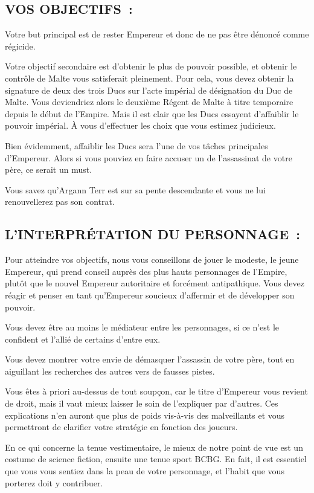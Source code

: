 \documentclass[14pt,twocolumn]{extarticle}
\begin{document}
\subsection{VOS OBJECTIFS~:}

Votre but principal est de rester Empereur et donc de ne pas être dénoncé
comme régicide.

Votre objectif secondaire est d'obtenir le plus de pouvoir possible, et obtenir
le contrôle de Malte vous satisferait pleinement. Pour cela, vous devez obtenir
la signature de deux des trois Ducs sur l'acte impérial de désignation du Duc
de Malte. Vous deviendriez alors le deuxième Régent de Malte à titre temporaire
depuis le début de l'Empire. Mais il est clair que les Ducs essayent
d'affaiblir le pouvoir impérial. À vous d'effectuer les choix que vous estimez
judicieux.

Bien évidemment, affaiblir les Ducs sera l'une de vos tâches principales
d'Empereur. Alors si vous pouviez en faire accuser un de l'assassinat de votre
père, ce serait un must.

Vous savez qu'Argann Terr est sur sa pente descendante et vous ne lui
renouvellerez pas son contrat.

\subsection{L'INTERPRÉTATION DU PERSONNAGE~:}

Pour atteindre vos objectifs, nous vous conseillons de jouer le modeste, le
jeune Empereur, qui prend conseil auprès des plus hauts personnages de
l'Empire, plutôt que le nouvel Empereur autoritaire et forcément antipathique.
Vous devez réagir et penser en tant qu'Empereur soucieux d'affermir et de
développer son pouvoir.

Vous devez être au moins le médiateur entre les personnages, si ce n'est le
confident et l'allié de certains d'entre eux.

Vous devez montrer votre envie de démasquer l'assassin de votre père, tout en
aiguillant les recherches des autres vers de fausses pistes.

Vous êtes à priori au-dessus de tout soupçon, car le titre d'Empereur vous
revient de droit, mais il vaut mieux laisser le soin de l'expliquer par
d'autres. Ces explications n'en auront que plus de poids vis-à-vis des
malveillants et vous permettront de clarifier votre stratégie en fonction des
joueurs.

En ce qui concerne la tenue vestimentaire, le mieux de notre point de vue est
un costume de science fiction, ensuite une tenue sport BCBG. En fait, il est
essentiel que vous vous sentiez dans la peau de votre personnage, et l'habit
que vous porterez doit y contribuer.
\end{document}
